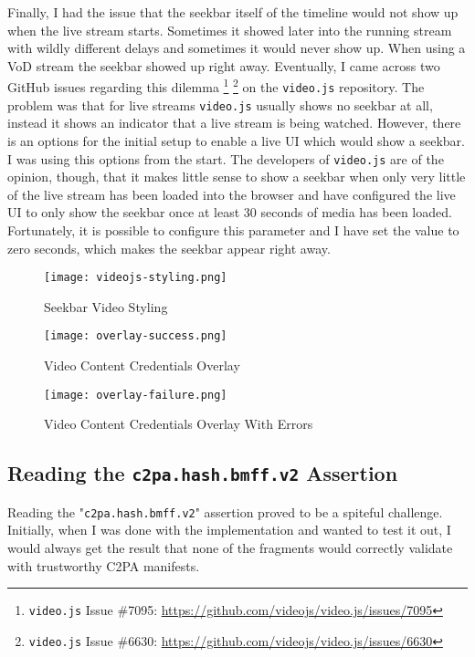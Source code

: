 Finally, I had the issue that the seekbar itself of the timeline would not show up when the live stream starts. Sometimes it showed later into the running stream with wildly different delays and sometimes it would never show up. When using a VoD stream the seekbar showed up right away. Eventually, I came across two GitHub issues regarding this dilemma \footnote{\texttt{video.js} Issue \#7095: \url{https://github.com/videojs/video.js/issues/7095}} \footnote{\texttt{video.js} Issue \#6630: \url{https://github.com/videojs/video.js/issues/6630}} on the \texttt{video.js} repository. The problem was that for live streams \texttt{video.js} usually shows no seekbar at all, instead it shows an indicator that a live stream is being watched. However, there is an options for the initial setup to enable a live UI which would show a seekbar. I was using this options from the start. The developers of \texttt{video.js} are of the opinion, though, that it makes little sense to show a seekbar when only very little of the live stream has been loaded into the browser and have configured the live UI to only show the seekbar once at least 30 seconds of media has been loaded. Fortunately, it is possible to configure this parameter and I have set the value to zero seconds, which makes the seekbar appear right away.

\begin{figure}
    \centering
    \texttt{[image: videojs-styling.png]}
    \caption{Seekbar Video Styling}
    \label{fig:seekbar}
\end{figure}
\begin{figure}
    \centering
    \texttt{[image: overlay-success.png]}
    \caption{Video Content Credentials Overlay}
    \label{fig:overlay-success}
\end{figure}
\begin{figure}
    \centering
    \texttt{[image: overlay-failure.png]}
    \caption{Video Content Credentials Overlay With Errors}
    \label{fig:overlay-failure}
\end{figure}

\subsection{Reading the \texttt{c2pa.hash.bmff.v2} Assertion}

Reading the "\texttt{c2pa.hash.bmff.v2}" assertion proved to be a spiteful challenge. Initially, when I was done with the implementation and wanted to test it out, I would always get the result that none of the fragments would correctly validate with trustworthy C2PA manifests.

